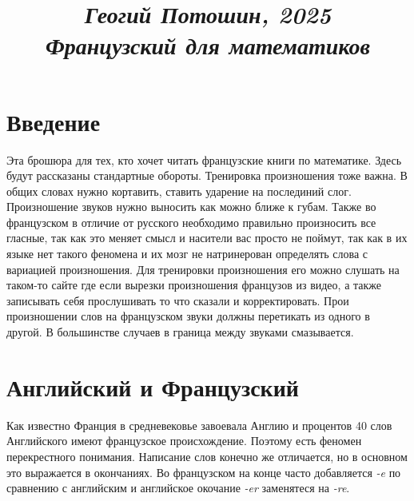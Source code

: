 \documentclass{article}
\begin{document}
\title{
\textit{\small{Геогий Потошин, 2025}}\\
\vspace{0.3ex}
\textit{\huge{Французский для математиков}}\vspace{1ex}
}
\date{\vspace{-5ex}}
\maketitle

\section{Введение}
Эта брошюра для тех, кто хочет читать французские книги по математике. Здесь
будут рассказаны стандартные обороты. Тренировка произношения тоже важна. В
общих словах нужно кортавить, ставить ударение на послединий слог. Произношение
звуков нужно выносить как можно ближе к губам. Также во французском в отличие от
русского необходимо правильно произносить все гласные, так как это меняет смысл
и насители вас просто не поймут, так как в их языке нет такого феномена и их
мозг не натринерован определять слова с вариацией произношения. Для тренировки
произношения его можно слушать на таком-то сайте где если вырезки произношения
французов из видео, а также записывать себя прослушивать то что сказали и
корректировать. Прои произношении слов на французском звуки должны перетикать
из одного в другой. В большинстве случаев в граница между звуками смазывается.

\section{Английский и Французский}
Как известно Франция в средневековье завоевала Англию и процентов 40 слов
Английского имеют французское происхождение. Поэтому есть феномен перекрестного
понимания. Написание слов конечно же отличается, но в основном это выражается
в окончаниях. Во французском на конце часто добавляется \emph{-e} по сравнению с
английским и английское окочание \emph{-er} заменятеся на \emph{-re}.
\end{document}

